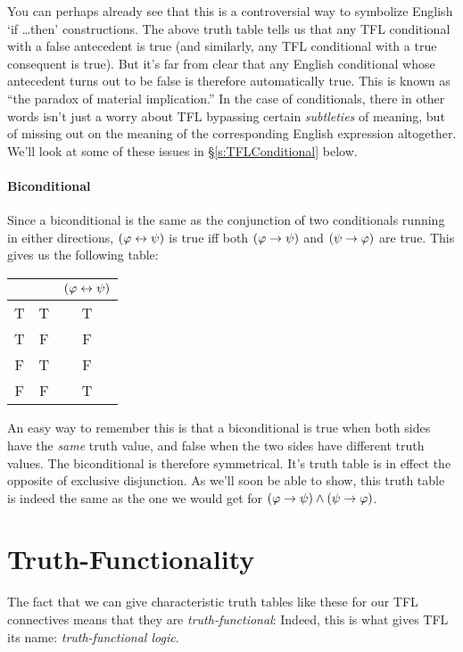 You can perhaps already see that this is a controversial way to symbolize English `if \ldots then' constructions.  The above truth table tells us that any TFL conditional with a false antecedent is true (and similarly, any TFL conditional with a true consequent is true).  But it's far from clear that any English conditional whose antecedent turns out to be false is therefore automatically true.  This is known as ``the paradox of material implication.'' In the case of conditionals, there in other words isn't just a worry about TFL bypassing certain \emph{subtleties} of meaning, but of missing out on the meaning of the corresponding English expression altogether.   We'll look at some of these issues in \S\ref{s:TFLConditional} below.


 \paragraph{Biconditional}  Since a biconditional is the same as the conjunction of two conditionals running in either directions, $(\mathcal{\varphi} \leftrightarrow \mathcal{\psi})$ is true iff both $(\mathcal{\varphi} \rightarrow \mathcal{\psi})$ and $(\mathcal{\psi} \rightarrow \mathcal{\varphi})$  are true.  This gives us the following table:


\begin{center}
\begin{tabular}{c c|c}
\meta{\varphi} & \meta{\psi} & $(\mathcal{\varphi}\leftrightarrow\mathcal{\psi})$\\
\hline
T & T & T\\
T & F & F\\
F & T & F\\
F & F & T
\end{tabular}
\end{center}
An easy way to remember this is that a biconditional is true when both sides have the \emph{same} truth value, and false when the two sides have different truth values.  The biconditional is therefore symmetrical.  It's truth table is in effect the opposite of exclusive disjunction.  As we'll  soon be able to show, this truth table is indeed the same as the one we would get for $(\mathcal{\varphi} \rightarrow \mathcal{\psi}) \wedge (\mathcal{\psi} \rightarrow \mathcal{\varphi})$.

\section{Truth-Functionality}

The fact that we can give characteristic truth tables like these for our TFL connectives means that they are \emph{truth-functional}:
Indeed, this is what gives TFL its name: \emph{truth-functional logic}.

